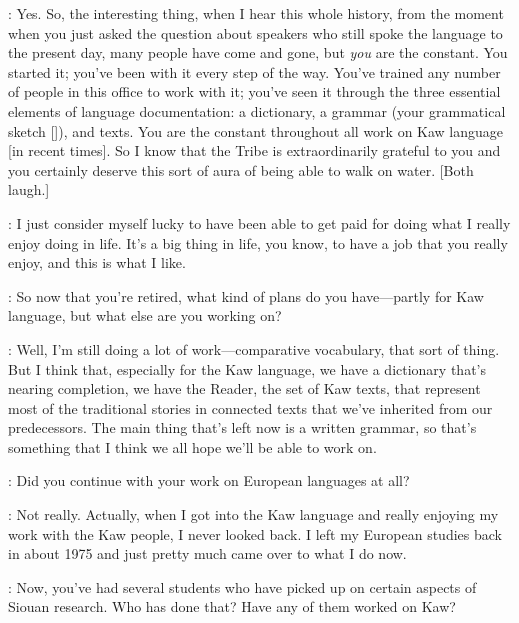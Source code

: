 \documentclass[output=paper]{LSP/langsci}
\begin{document}
: Yes. So, the interesting thing, when I hear this whole history, from the moment when you just asked the question about speakers who still spoke the language to the present day, many people have come and gone, but \textit{you} are the constant. You started it; you've been with it every step of the way. You've trained any number of people in this office to work with it; you've seen it through the three essential elements of language documentation: a dictionary, a grammar (your grammatical sketch [\citealt{Rankin1989}]), and texts. You are the constant throughout all work on Kaw language [in recent times]. So I know that the Tribe is extraordinarily grateful to you and you certainly deserve this sort of aura of being able to walk on water. [Both laugh.]

: I just consider myself lucky to have been able to get paid for doing what I really enjoy doing in life. It's a big thing in life, you know, to have a job that you really enjoy, and this is what I like.

: So now that you're retired, what kind of plans do you have---partly for Kaw language, but what else are you working on?

: Well, I'm still doing a lot of work---comparative vocabulary, that sort of thing. But I think that, especially for the Kaw language, we have a dictionary that's nearing completion, we have the Reader, the set of Kaw texts, that represent most of the traditional stories in connected texts that we've inherited from our predecessors. The main thing that's left now is a written grammar, so that's something that I think we all hope we'll be able to work on.

: Did you continue with your work on European languages at all?

: Not really. Actually, when I got into the Kaw language and really enjoying my work with the Kaw people, I never looked back. I left my European studies back in about 1975 and just pretty much came over to what I do now.

: Now, you've had several students who have picked up on certain aspects of Siouan research. Who has done that? Have any of them worked on Kaw?
\end{document}
